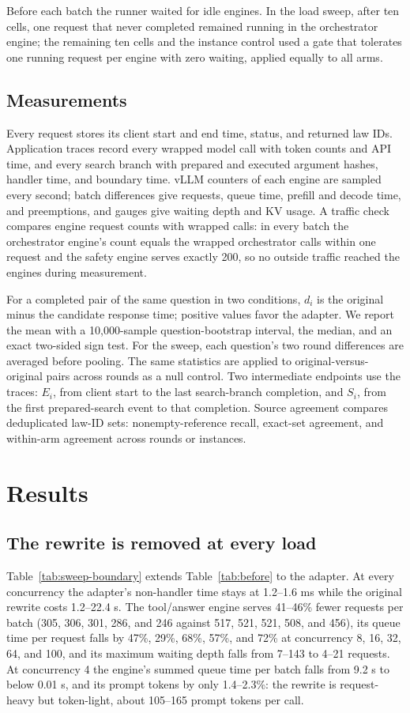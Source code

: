 \documentclass[paper]{ieice}
\begin{document}
Before each batch the runner waited for idle engines. In the load sweep, after ten cells, one request that never completed remained running in the orchestrator engine; the remaining ten cells and the instance control used a gate that tolerates one running request per engine with zero waiting, applied equally to all arms.

\subsection{Measurements}
Every request stores its client start and end time, status, and returned law IDs. Application traces record every wrapped model call with token counts and API time, and every search branch with prepared and executed argument hashes, handler time, and boundary time. vLLM counters of each engine are sampled every second; batch differences give requests, queue time, prefill and decode time, and preemptions, and gauges give waiting depth and KV usage. A traffic check compares engine request counts with wrapped calls: in every batch the orchestrator engine's count equals the wrapped orchestrator calls within one request and the safety engine serves exactly 200, so no outside traffic reached the engines during measurement.

For a completed pair of the same question in two conditions, $d_i$ is the original minus the candidate response time; positive values favor the adapter. We report the mean with a 10,000-sample question-bootstrap interval, the median, and an exact two-sided sign test. For the sweep, each question's two round differences are averaged before pooling. The same statistics are applied to original-versus-original pairs across rounds as a null control. Two intermediate endpoints use the traces: $E_i$, from client start to the last search-branch completion, and $S_i$, from the first prepared-search event to that completion. Source agreement compares deduplicated law-ID sets: nonempty-reference recall, exact-set agreement, and within-arm agreement across rounds or instances.

\section{Results}
\subsection{The rewrite is removed at every load}
Table~\ref{tab:sweep-boundary} extends Table~\ref{tab:before} to the adapter. At every concurrency the adapter's non-handler time stays at 1.2--1.6 ms while the original rewrite costs 1.2--22.4 s. The tool/answer engine serves 41--46\% fewer requests per batch (305, 306, 301, 286, and 246 against 517, 521, 521, 508, and 456), its queue time per request falls by 47\%, 29\%, 68\%, 57\%, and 72\% at concurrency 8, 16, 32, 64, and 100, and its maximum waiting depth falls from 7--143 to 4--21 requests. At concurrency 4 the engine's summed queue time per batch falls from 9.2 s to below 0.01 s, and its prompt tokens by only 1.4--2.3\%: the rewrite is request-heavy but token-light, about 105--165 prompt tokens per call.
\end{document}
